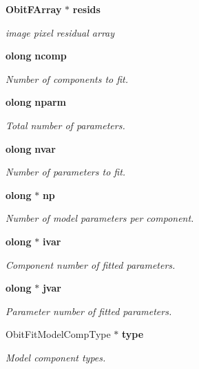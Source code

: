 \begin{CompactItemize}
{\bf Obit\-FArray} $\ast$ {\bf resids}
\begin{CompactList}\small\item\em image pixel residual array \item\end{CompactList}\item 
{\bf olong} {\bf ncomp}
\begin{CompactList}\small\item\em Number of components to fit. \item\end{CompactList}\item 
{\bf olong} {\bf nparm}
\begin{CompactList}\small\item\em Total number of parameters. \item\end{CompactList}\item 
{\bf olong} {\bf nvar}
\begin{CompactList}\small\item\em Number of parameters to fit. \item\end{CompactList}\item 
{\bf olong} $\ast$ {\bf np}
\begin{CompactList}\small\item\em Number of model parameters per component. \item\end{CompactList}\item 
{\bf olong} $\ast$ {\bf ivar}
\begin{CompactList}\small\item\em Component number of fitted parameters. \item\end{CompactList}\item 
{\bf olong} $\ast$ {\bf jvar}
\begin{CompactList}\small\item\em Parameter number of fitted parameters. \item\end{CompactList}\item 
Obit\-Fit\-Model\-Comp\-Type $\ast$ {\bf type}
\begin{CompactList}\small\item\em Model component types. \item\end{CompactList}\item 

\end{CompactItemize}
